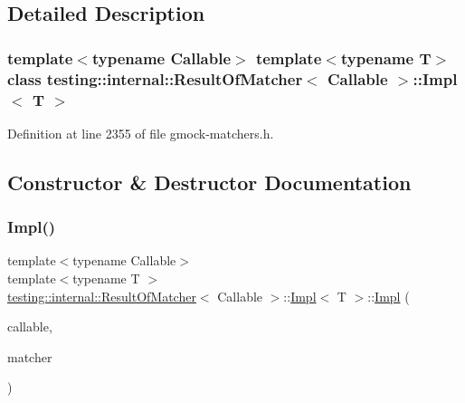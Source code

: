 \subsection{Detailed Description}
\subsubsection*{template$<$typename Callable$>$\newline
template$<$typename T$>$\newline
class testing\+::internal\+::\+Result\+Of\+Matcher$<$ Callable $>$\+::\+Impl$<$ T $>$}



Definition at line 2355 of file gmock-\/matchers.\+h.



\subsection{Constructor \& Destructor Documentation}
\mbox{\label{classtesting_1_1internal_1_1ResultOfMatcher_1_1Impl_aff0e17018118fa5e173d453a735964b2}} 
\subsubsection{\texorpdfstring{Impl()}{Impl()}}
{\footnotesize\ttfamily template$<$typename Callable$>$ \\
template$<$typename T $>$ \\
\hyperlink{classtesting_1_1internal_1_1ResultOfMatcher}{testing\+::internal\+::\+Result\+Of\+Matcher}$<$ Callable $>$\+::\hyperlink{classtesting_1_1internal_1_1ResultOfMatcher_1_1Impl}{Impl}$<$ T $>$\+::\hyperlink{classtesting_1_1internal_1_1ResultOfMatcher_1_1Impl}{Impl} (\begin{DoxyParamCaption}\item[{\hyperlink{classtesting_1_1internal_1_1ResultOfMatcher_a6f7f7d80162bebdf73681d6a3aa92c7d}{Callable\+Storage\+Type}}]{callable,  }\item[{const \hyperlink{classtesting_1_1Matcher}{Matcher}$<$ \hyperlink{classtesting_1_1internal_1_1ResultOfMatcher_aa9db2267792fcae2cfa3f57683f4e048}{Result\+Type} $>$ \&}]{matcher }\end{DoxyParamCaption})\hspace{0.3cm}{\ttfamily [inline]}}



